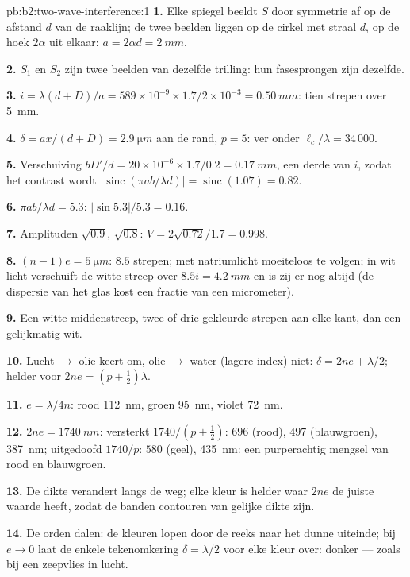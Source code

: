 \begin{solution}{pb:b2:two-wave-interference:1}
\textbf{1.} Elke spiegel beeldt $S$ door symmetrie af op de afstand $d$ van
de raaklijn; de twee beelden liggen op de cirkel met straal $d$, op
de hoek $2\alpha$ uit elkaar: $a = 2\alpha d = \qty{2}{mm}$.

\textbf{2.} $S_1$ en $S_2$ zijn twee beelden van dezelfde trilling: hun
fasesprongen zijn dezelfde.

\textbf{3.}
$i = \lambda(d + D)/a = 589 \times 10^{-9} \times 1.7/2 \times 10^{-3} = \qty{0.50}{mm}$:
tien
strepen over \qty{5}{mm}.

\textbf{4.} $\delta = ax/(d + D) = \qty{2.9}{\micro m}$ aan de rand,
$p = 5$: ver onder
$\ell_c/\lambda = 34\,000$.

\textbf{5.} Verschuiving
$bD'/d = 20 \times 10^{-6} \times 1.7/0.2 = \qty{0.17}{mm}$, een derde van
$i$, zodat het contrast wordt
$|\operatorname{sinc}(\pi ab/\lambda d)| = \operatorname{sinc}(1.07) = 0.82$.

\textbf{6.} $\pi ab/\lambda d = 5.3$: $|\sin5.3|/5.3 = 0.16$.

\textbf{7.} Amplituden $\sqrt{0.9}$, $\sqrt{0.8}$: $V = 2\sqrt{0.72}/1.7 = 0.998$.

\textbf{8.} $(n - 1)e = \qty{5}{\micro m}$: $8.5$ strepen; met natriumlicht
moeiteloos te volgen; in wit licht verschuift de witte streep over
$8.5i = \qty{4.2}{mm}$
en is zij er nog altijd (de dispersie van het glas kost een fractie van een
micrometer).

\textbf{9.} Een witte middenstreep, twee of drie gekleurde strepen aan
elke kant, dan een gelijkmatig wit.

\textbf{10.} Lucht $\to$ olie keert om, olie $\to$ water (lagere index) niet:
$\delta = 2ne + \lambda/2$; helder voor $2ne = (p + \tfrac12)\lambda$.

\textbf{11.} $e = \lambda/4n$: rood \qty{112}{nm}, groen \qty{95}{nm},
violet \qty{72}{nm}.

\textbf{12.} $2ne = \qty{1740}{nm}$: versterkt $1740/(p + \tfrac12)$: $696$
(rood), $497$
(blauwgroen), \qty{387}{nm}; uitgedoofd $1740/p$: $580$ (geel), \qty{435}{nm}:
een purperachtig mengsel van rood en blauwgroen.

\textbf{13.} De dikte verandert langs de weg; elke kleur is helder
waar $2ne$ de juiste waarde heeft, zodat de banden contouren van gelijke
dikte zijn.

\textbf{14.} De orden dalen: de kleuren lopen door de reeks
naar het dunne uiteinde; bij $e \to 0$ laat de enkele tekenomkering
$\delta = \lambda/2$ voor elke kleur over: donker --- zoals bij een
zeepvlies in lucht.


\end{solution}
